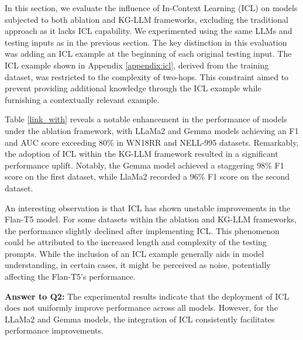 \documentclass[pmlr]{jmlr}%
\begin{document}
In this section, we evaluate the influence of In-Context Learning (ICL) on models subjected to both ablation and KG-LLM frameworks, excluding the traditional approach as it lacks ICL capability. We experimented using the same LLMs and testing inputs as in the previous section. The key distinction in this evaluation was adding an ICL example at the beginning of each original testing input. The ICL example shown in Appendix \ref{appendix:icl}, derived from the training dataset, was restricted to the complexity of two-hops. This constraint aimed to prevent providing additional knowledge through the ICL example while furnishing a contextually relevant example.

Table \ref{link_with} reveals a notable enhancement in the performance of models under the ablation framework, with LLaMa2 and Gemma models achieving an F1 and AUC score exceeding 80\% in WN18RR and NELL-995 datasets. Remarkably, the adoption of ICL within the KG-LLM framework resulted in a significant performance uplift. Notably, the Gemma model achieved a staggering 98\% F1 score on the first dataset, while LlaMa2 recorded a 96\% F1 score on the second dataset.

An interesting observation is that ICL has shown unstable improvements in the Flan-T5 model. For some datasets within the ablation and KG-LLM frameworks, the performance slightly declined after implementing ICL. This phenomenon could be attributed to the increased length and complexity of the testing prompts. While the inclusion of an ICL example generally aids in model understanding, in certain cases, it might be perceived as noise, potentially affecting the Flan-T5's performance.

\noindent
\textbf{Answer to Q2:} The experimental results indicate that the deployment of ICL does not uniformly improve performance across all models. However, for the LLaMa2 and Gemma models, the integration of ICL consistently facilitates performance improvements.



\end{document}
